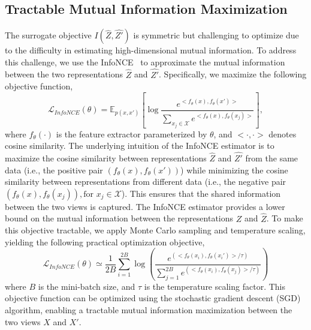 \subsection{Tractable Mutual Information Maximization}
The surrogate objective $I(\hat{Z},\hat{Z'})$ is symmetric but challenging to optimize due to the difficulty in estimating high-dimensional mutual information. To address this challenge, we use the InfoNCE~\cite{oord2018representation} to approximate the mutual information between the two representations $\hat{Z}$ and $\hat{Z'}$. Specifically, we maximize the following objective function,
\begin{equation}
    \label{eq:infonce_objective}
    \mathcal{L}_{InfoNCE}(\theta) = \mathbb{E}_{p(x,x')}[\log\frac{e^{<f_\theta(x),f_\theta(x')>}}{\sum_{x_j\in \mathcal{X}}e^{<f_\theta(x),f_\theta(x_j)>}}],
\end{equation}
where $f_\theta(\cdot)$ is the feature extractor parameterized by $\theta$, and $<\cdot,\cdot>$ denotes cosine similarity. 
The underlying intuition of the InfoNCE estimator is to maximize the cosine similarity between representations $\hat{Z}$ and $\hat{Z'}$ from the same data (i.e., the positive pair $(f_\theta(x),f_\theta(x'))$) while minimizing the cosine similarity between representations from different data (i.e., the negative pair $(f_\theta(x),f_\theta(x_j)), \text{for } x_j \in \mathcal{X}$). This ensures that the shared information between the two views is captured. The InfoNCE estimator provides a lower bound on the mutual information between the representations $Z$ and $\hat{Z}$.
To make this objective tractable, we apply Monte Carlo sampling and temperature scaling, yielding the following practical optimization objective,
\begin{equation}
    \label{eq:infonce_objective_mc}
    \mathcal{L}_{InfoNCE}(\theta)\simeq\frac{1}{2 B} \sum_{i=1}^{2 B}\log \left(\frac{e^{\left(<f_\theta(x_i),f_\theta(x_i')>/\tau\right)}}{\sum_{j=1}^{2B}e^{\left(<f_\theta(x_i),f_\theta(x_j)>/\tau\right)}}\right)
\end{equation}
where $B$ is the mini-batch size, and $\tau$ is the temperature scaling factor. This objective function can be optimized using the stochastic gradient descent (SGD) algorithm, enabling a tractable mutual information maximization between the two views $X$ and $X'$.
